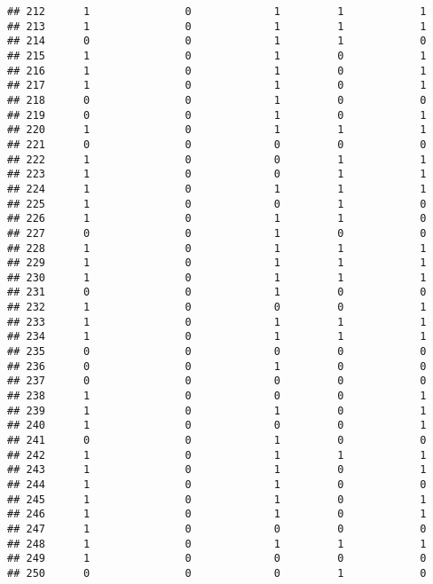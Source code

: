 \documentclass[]{article}
\begin{document}
\begin{verbatim}
## 212      1               0             1         1            1
## 213      1               0             1         1            1
## 214      0               0             1         1            0
## 215      1               0             1         0            1
## 216      1               0             1         0            1
## 217      1               0             1         0            1
## 218      0               0             1         0            0
## 219      0               0             1         0            1
## 220      1               0             1         1            1
## 221      0               0             0         0            0
## 222      1               0             0         1            1
## 223      1               0             0         1            1
## 224      1               0             1         1            1
## 225      1               0             0         1            0
## 226      1               0             1         1            0
## 227      0               0             1         0            0
## 228      1               0             1         1            1
## 229      1               0             1         1            1
## 230      1               0             1         1            1
## 231      0               0             1         0            0
## 232      1               0             0         0            1
## 233      1               0             1         1            1
## 234      1               0             1         1            1
## 235      0               0             0         0            0
## 236      0               0             1         0            0
## 237      0               0             0         0            0
## 238      1               0             0         0            1
## 239      1               0             1         0            1
## 240      1               0             0         0            1
## 241      0               0             1         0            0
## 242      1               0             1         1            1
## 243      1               0             1         0            1
## 244      1               0             1         0            0
## 245      1               0             1         0            1
## 246      1               0             1         0            1
## 247      1               0             0         0            0
## 248      1               0             1         1            1
## 249      1               0             0         0            0
## 250      0               0             0         1            0

\end{verbatim}
\end{document}
